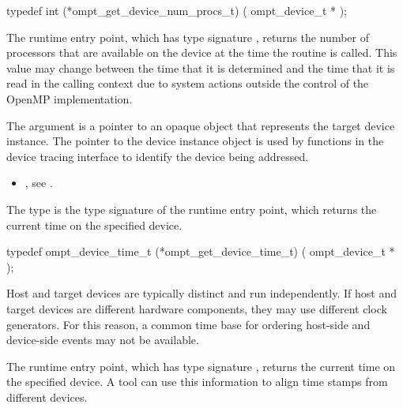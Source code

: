 \format
\begin{ccppspecific}
\begin{omptInquiry}
typedef int (*ompt_get_device_num_procs_t) (
  ompt_device_t *
);
\end{omptInquiry}
\end{ccppspecific}

\descr
The  runtime entry point, which has type 
signature , returns the number of processors 
that are available on the device at the time the routine is called. This value 
may change between the time that it is determined and the time that it is read 
in the calling context due to system actions outside the control of the OpenMP 
implementation.

\argdesc
The  argument is a pointer to an opaque object that
represents the target device instance. The pointer to the device
instance object is used by functions in the device tracing interface
to identify the device being addressed.

\crossreferences
\begin{itemize}
\item {}, see .
\end{itemize}



\label{sec:ompt_get_device_time_t}

\summary
The  type is the type signature of the 
 runtime entry point, which returns the 
current time on the specified device.

\format
\begin{ccppspecific}
\begin{omptInquiry}
typedef ompt_device_time_t (*ompt_get_device_time_t) (
  ompt_device_t *
);
\end{omptInquiry}
\end{ccppspecific}

\descr
Host and target devices are typically distinct and run independently.
If host and target devices are different hardware components, they
may use different clock generators. For this reason, a common time 
base for ordering host-side and device-side events may not be available.

The  runtime entry point, which has type 
signature , returns the current time on 
the specified device. A tool can use this information to align time 
stamps from different devices.

